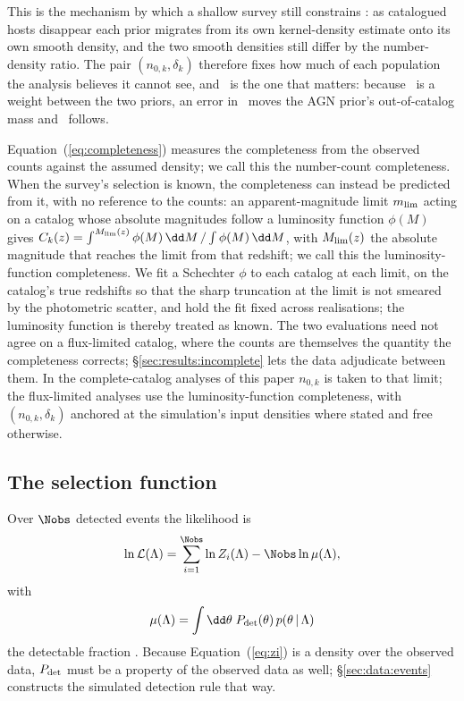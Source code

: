This is the mechanism by which a shallow survey still constrains \fagn: as
catalogued hosts disappear each prior migrates from its own kernel-density
estimate onto its own smooth density, and the two smooth densities still differ
by the number-density ratio. The pair $(n_{0,k}, \delta_k)$ therefore fixes how
much of each population the analysis believes it cannot see, and \nzagn\ is the
one that matters: because \fagn\ is a weight between the two priors, an error
in \nzagn\ moves the AGN prior's out-of-catalog mass and \fagn\ follows.

Equation~(\ref{eq:completeness}) measures the completeness from the observed
counts against the assumed density; we call this the number-count
completeness. When the survey's selection is known, the completeness can
instead be predicted from it, with no reference to the counts: an
apparent-magnitude limit $m_{\rm lim}$ acting on a catalog whose absolute
magnitudes follow a luminosity function $\phi(M)$ gives
$C_k(z) = \int^{M_{\rm lim}(z)} \phi(M)\,\dd M \,/ \int \phi(M)\,\dd M$, with
$M_{\rm lim}(z)$ the absolute magnitude that reaches the limit from that
redshift; we call this the luminosity-function completeness. We fit a
Schechter $\phi$ \citep{Schechter1976} to each catalog at each limit, on the
catalog's true redshifts so that the sharp truncation at the limit is not
smeared by the photometric scatter, and hold the fit fixed across
realisations; the luminosity function is thereby treated as known. The two
evaluations need not agree on a flux-limited catalog, where the counts are
themselves the quantity the completeness corrects;
\S\ref{sec:results:incomplete} lets the data adjudicate between them. In the
complete-catalog analyses of this paper $n_{0,k}$ is taken to that limit;
the flux-limited analyses use the luminosity-function completeness, with
$(n_{0,k}, \delta_k)$ anchored at the simulation's input densities where
stated and free otherwise.

\subsection{The selection function}
\label{sec:methods:selection}

Over $\Nobs$ detected events the likelihood is
\begin{equation}
  \ln \mathcal{L}(\Lambda) = \sum_{i=1}^{\Nobs} \ln Z_i(\Lambda)
      - \Nobs \ln \mu(\Lambda),
  \label{eq:like}
\end{equation}
with
\begin{equation}
  \mu(\Lambda) = \int \dd\theta\; P_{\rm det}(\theta)\, p(\theta \,|\, \Lambda)
  \label{eq:mu}
\end{equation}
the detectable fraction \citep{MandelFarrGair2019, Vitale2022}. Because
Equation~(\ref{eq:zi}) is a density over the observed data, $P_{\rm det}$ must
be a property of the observed data as well; \S\ref{sec:data:events} constructs
the simulated detection rule that way.

